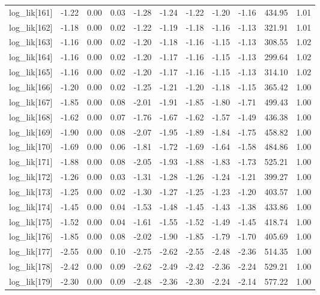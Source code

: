 \begin{table}[ht]
\begin{tabular}{rrrrrrrrrrr}
  log\_lik[161] & -1.22 & 0.00 & 0.03 & -1.28 & -1.24 & -1.22 & -1.20 & -1.16 & 434.95 & 1.01 \\ 
  log\_lik[162] & -1.18 & 0.00 & 0.02 & -1.22 & -1.19 & -1.18 & -1.16 & -1.13 & 321.91 & 1.01 \\ 
  log\_lik[163] & -1.16 & 0.00 & 0.02 & -1.20 & -1.18 & -1.16 & -1.15 & -1.13 & 308.55 & 1.02 \\ 
  log\_lik[164] & -1.16 & 0.00 & 0.02 & -1.20 & -1.17 & -1.16 & -1.15 & -1.13 & 299.64 & 1.02 \\ 
  log\_lik[165] & -1.16 & 0.00 & 0.02 & -1.20 & -1.17 & -1.16 & -1.15 & -1.13 & 314.10 & 1.02 \\ 
  log\_lik[166] & -1.20 & 0.00 & 0.02 & -1.25 & -1.21 & -1.20 & -1.18 & -1.15 & 365.42 & 1.00 \\ 
  log\_lik[167] & -1.85 & 0.00 & 0.08 & -2.01 & -1.91 & -1.85 & -1.80 & -1.71 & 499.43 & 1.00 \\ 
  log\_lik[168] & -1.62 & 0.00 & 0.07 & -1.76 & -1.67 & -1.62 & -1.57 & -1.49 & 436.38 & 1.00 \\ 
  log\_lik[169] & -1.90 & 0.00 & 0.08 & -2.07 & -1.95 & -1.89 & -1.84 & -1.75 & 458.82 & 1.00 \\ 
  log\_lik[170] & -1.69 & 0.00 & 0.06 & -1.81 & -1.72 & -1.69 & -1.64 & -1.58 & 484.86 & 1.00 \\ 
  log\_lik[171] & -1.88 & 0.00 & 0.08 & -2.05 & -1.93 & -1.88 & -1.83 & -1.73 & 525.21 & 1.00 \\ 
  log\_lik[172] & -1.26 & 0.00 & 0.03 & -1.31 & -1.28 & -1.26 & -1.24 & -1.21 & 399.27 & 1.00 \\ 
  log\_lik[173] & -1.25 & 0.00 & 0.02 & -1.30 & -1.27 & -1.25 & -1.23 & -1.20 & 403.57 & 1.00 \\ 
  log\_lik[174] & -1.45 & 0.00 & 0.04 & -1.53 & -1.48 & -1.45 & -1.43 & -1.38 & 433.86 & 1.00 \\ 
  log\_lik[175] & -1.52 & 0.00 & 0.04 & -1.61 & -1.55 & -1.52 & -1.49 & -1.45 & 418.74 & 1.00 \\ 
  log\_lik[176] & -1.85 & 0.00 & 0.08 & -2.02 & -1.90 & -1.85 & -1.79 & -1.70 & 405.69 & 1.00 \\ 
  log\_lik[177] & -2.55 & 0.00 & 0.10 & -2.75 & -2.62 & -2.55 & -2.48 & -2.36 & 514.35 & 1.00 \\ 
  log\_lik[178] & -2.42 & 0.00 & 0.09 & -2.62 & -2.49 & -2.42 & -2.36 & -2.24 & 529.21 & 1.00 \\ 
  log\_lik[179] & -2.30 & 0.00 & 0.09 & -2.48 & -2.36 & -2.30 & -2.24 & -2.14 & 577.22 & 1.00 \\ 

\end{tabular}
\end{table}
